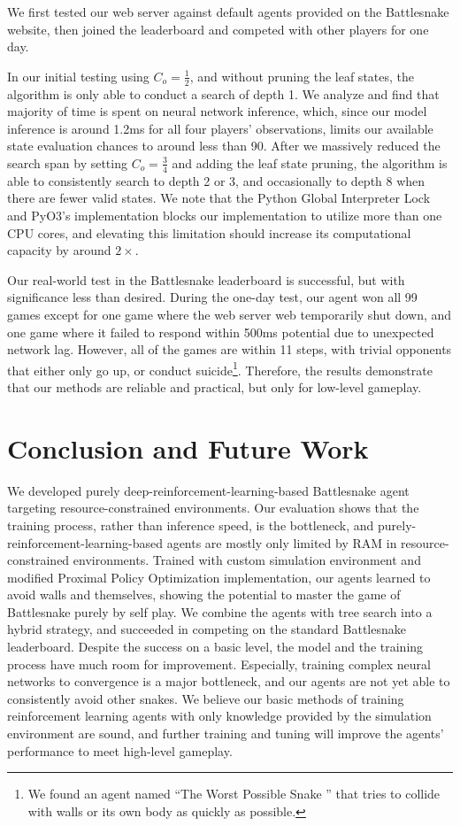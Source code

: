 \documentclass[conference]{IEEEtran}
\newcommand{\todo}[1]{\textcolor{red}{[ #1 ]}}
\renewcommand{\todo}[1]{} %
\begin{document}
We first tested our web server against default agents provided on the
Battlesnake website,
then joined the leaderboard and competed with other players for one day.

In our initial testing using $C_o=\frac{1}{2}$,
and without pruning the leaf states,
the algorithm is only able to conduct a search of depth 1.
We analyze and find that majority of time is spent on neural network inference,
which,
since our model inference is around 1.2ms for all four players' observations,
limits our available state evaluation chances to around less than 90.
After we massively reduced the search span by setting $C_o=\frac{3}{4}$ and
adding the leaf state pruning,
the algorithm is able to consistently search to depth 2 or 3,
and occasionally to depth 8 when there are fewer valid states.
We note that the Python Global Interpreter Lock and PyO3's implementation blocks
our implementation to utilize more than one CPU cores,
and elevating this limitation should increase its computational capacity by
around $2\times$.

Our real-world test in the Battlesnake leaderboard is successful,
but with significance less than desired. During the one-day test,
our agent won all 99 games except for one game where the web server web
temporarily shut down,
and one game where it failed to respond within 500ms potential due to unexpected
network lag. However, all of the games are within 11 steps,
with trivial opponents that either only go up,
or conduct suicide\footnote{We found an agent named ``The Worst Possible Snake
    '' that tries to collide with walls or its own body as quickly as
    possible.}.
Therefore, the results demonstrate that our methods are reliable and practical,
but only for low-level gameplay.

\todo{analyze the experimental data accordingly}

\section{Conclusion and Future Work}\label{sec:conclusion}

We developed purely deep-reinforcement-learning-based Battlesnake agent
targeting resource-constrained environments.
Our evaluation shows that the training process, rather than inference speed,
is the bottleneck,
and purely-reinforcement-learning-based agents are mostly only limited by RAM in
resource-constrained environments.
Trained with custom simulation environment and modified Proximal Policy
Optimization implementation, our agents learned to avoid walls and themselves,
showing the potential to master the game of Battlesnake purely by self play.
We combine the agents with tree search into a hybrid strategy,
and succeeded in competing on the standard Battlesnake leaderboard.
Despite the success on a basic level,
the model and the training process have much room for improvement. Especially,
training complex neural networks to convergence is a major bottleneck,
and our agents are not yet able to consistently avoid other snakes.
We believe our basic methods of training reinforcement learning agents with only
knowledge provided by the simulation environment are sound,
and further training and tuning will improve the agents' performance to meet
high-level gameplay.

\printbibliography
\end{document}
